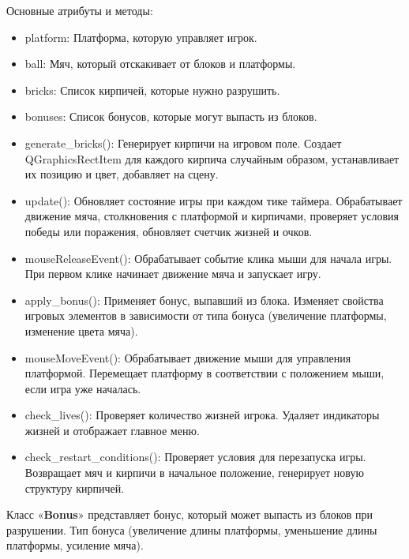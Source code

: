 Основные атрибуты и методы:
\begin{itemize}
    \item platform: Платформа, которую управляет игрок.
    \item ball: Мяч, который отскакивает от блоков и платформы.
    \item bricks: Список кирпичей, которые нужно разрушить.
    \item bonuses: Список бонусов, которые могут выпасть из блоков.
    \item generate\_bricks(): Генерирует кирпичи на игровом поле. Создает QGraphicsRectItem для каждого кирпича случайным образом, устанавливает их позицию и цвет, добавляет на сцену.
    \item update(): Обновляет состояние игры при каждом тике таймера. Обрабатывает движение мяча, столкновения с платформой и кирпичами, проверяет условия победы или поражения, обновляет счетчик жизней и очков.
    \item mouseReleaseEvent(): Обрабатывает событие клика мыши для начала игры. При первом клике начинает движение мяча и запускает игру.
    \item apply\_bonus(): Применяет бонус, выпавший из блока. Изменяет свойства игровых элементов в зависимости от типа бонуса (увеличение платформы, изменение цвета мяча).
    \item mouseMoveEvent(): Обрабатывает движение мыши для управления платформой. Перемещает платформу в соответствии с положением мыши, если игра уже началась.
    \item check\_lives(): Проверяет количество жизней игрока. Удаляет индикаторы жизней и отображает главное меню.
    \item check\_restart\_conditions(): Проверяет условия для перезапуска игры. Возвращает мяч и кирпичи в начальное положение, генерирует новую структуру кирпичей.
\end{itemize}

Класс «\textbf{Bonus}»  представляет бонус, который может выпасть из блоков при разрушении. Тип бонуса (увеличение длины платформы, уменьшение длины платформы, усиление мяча).

